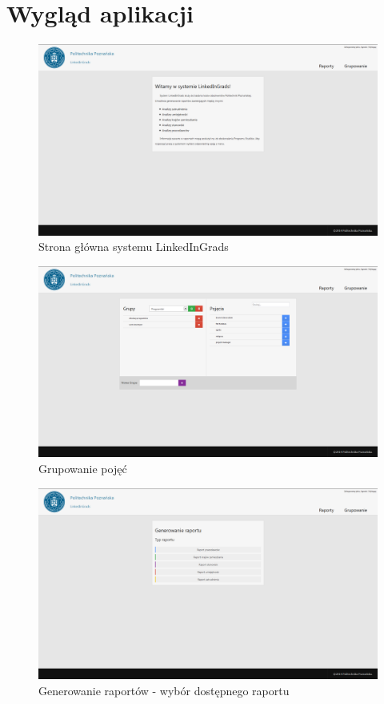 \chapter{Wygląd aplikacji}
\label{Chapterb1}

\begin{figure}[H] 
\centering\includegraphics[width=15cm]{figures/image14}
\caption{Strona główna systemu LinkedInGrads}\label{rys:use-case-diagram}
\end{figure}

\begin{figure}[H] 
\centering\includegraphics[width=15cm]{figures/image15}
\caption{Grupowanie pojęć}\label{rys:use-case-diagram}
\end{figure}

\begin{figure}[H] 
\centering\includegraphics[width=15cm]{figures/image16}
\caption{Generowanie raportów - wybór dostępnego raportu}\label{rys:use-case-diagram}
\end{figure}

